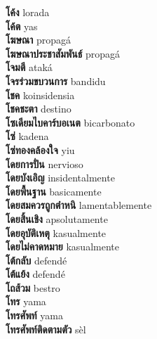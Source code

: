 \textbf{ โค้ง  } lorada \\
\textbf{ โค้ต  } yas \\
\textbf{ โฆษณา  } propagá \\
\textbf{ โฆษณาประชาสัมพันธ์  } propagá \\
\textbf{ โจมตี  } ataká \\
\textbf{ โจรร่วมขบวนการ  } bandidu \\
\textbf{ โชค  } koinsidensia \\
\textbf{ โชคชะตา  } destino \\
\textbf{ โซเดียมไบคาร์บอเนต  } bicarbonato \\
\textbf{ โซ่  } kadena \\
\textbf{ โซ่ทองคล้องใจ  } yiu \\
\textbf{ โดยการปั่น  } nervioso \\
\textbf{ โดยบังเอิญ  } insidentalmente \\
\textbf{ โดยพื้นฐาน  } basicamente \\
\textbf{ โดยสมควรถูกตำหนิ  } lamentablemente \\
\textbf{ โดยสิ้นเชิง  } apsolutamente \\
\textbf{ โดยอุบัติเหตุ  } kasualmente \\
\textbf{ โดยไม่คาดหมาย  } kasualmente \\
\textbf{ โต้กลับ  } defendé \\
\textbf{ โต้แย้ง  } defendé \\
\textbf{ โถส้วม  } bestro \\
\textbf{ โทร  } yama \\
\textbf{ โทรศัพท์  } yama \\
\textbf{ โทรศัพท์ติดตามตัว  } sèl \\
